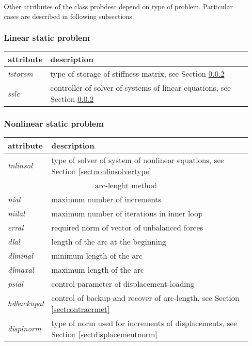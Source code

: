 Other attributes of the class {\sf probdesc} depend on type of problem. Particular cases
are described in following subsections.

\subsubsection{Linear static problem}

\begin{center}
\begin{tabular}{|l|l|}
\hline
attribute & description
\\ \hline
{\it tstorsm} & type of storage of stiffness matrix, see Section \ref{}
\\
{\it ssle} & controller of solver of systems of linear equations, see Section \ref{}
\\ \hline
\end{tabular}
\end{center}

\subsubsection{Nonlinear static problem}

\begin{center}
\begin{tabular}{|l|l|}
\hline
attribute & description
\\ \hline
{\it tnlinsol} & type of solver of system of nonlinear equations, see Section \ref{sectnonlinsolvertype}
\\ \hline
\multicolumn{2}{c}{arc-lenght method}
\\ \hline
{\it nial} & maximum number of increments
\\
{\it niilal} & maximum number of iterations in inner loop
\\
{\it erral} & required norm of vector of unbalanced forces
\\
{\it dlal} & length of the arc at the beginning
\\
{\it dlminal} & minimum length of the arc
\\
{\it dlmaxal} & maximum length of the arc
\\
{\it psial} & control parameter of displacement-loading
\\
{\it hdbackupal} & control of backup and recover of arc-length, see Section \ref{sectcontracrmet}
\\
{\it displnorm} & type of norm used for increments of displacements, see Section \ref{sectdisplacementnorm}
\\ \hline
\end{tabular}
\end{center}



